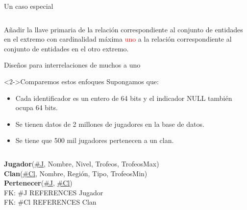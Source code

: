 \begin{frame}{Un caso especial}
\begin{columns}[T]
\begin{column}{0.50\linewidth}
\begin{scriptsize}
        
            \end{scriptsize}
        \end{column}
        
    \end{columns}
   
    \vspace{10mm}
    A\~nadir la llave primaria de la relaci\'on correspondiente al conjunto de entidades en el extremo con cardinalidad
            m\'axima \textcolor{red}{uno}
            a la relaci\'on correspondiente al conjunto de entidades en el otro extremo.
    

\end{frame}


\begin{frame}{Dise\~nos para interrelaciones de muchos a uno}
    \begin{small}
        
        \begin{block}<2->{Comparemos estos enfoques}
            Supongamos que: \begin{itemize}
                \item  Cada identificador es un entero de 64 bits y el indicador NULL tambi\'en ocupa 64 bits.
                \item  Se tienen datos de 2 millones de jugadores en la base de datos.
                \item  {Se tiene que 500 mil jugadores pertenecen a un clan.}
            \end{itemize}
        \end{block}
    \end{small}

    \begin{columns}[T]
        \begin{column}{0.48\linewidth}
            \begin{scriptsize}
                \textbf{Jugador}(\underline{\#J}, Nombre, Nivel, Trofeos, TrofeosMax)\\[2mm]
                \textbf{Clan}(\underline{\#Cl}, Nombre, Regi\'on, Tipo, TrofeosMin)\\[2mm]
  
                \textbf{Pertenecer}(\underline{\#J}, \underline{\#Cl})\\[1mm]
                \hspace{4mm} FK: \#J REFERENCES Jugador\\
                \hspace{4mm} FK: \#Cl REFERENCES Clan
            \end{scriptsize}


\end{column}
\end{columns}
\end{frame}

